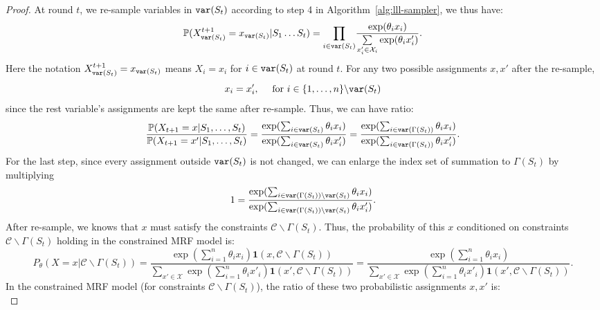 \begin{lemma}
\begin{proof}
At round $t$,  we re-sample variables in $\mathtt{var}(S_t)$ according to step 4 in Algorithm~\ref{alg:lll-sampler}, we thus have:
\begin{equation*}
\mathbb{P}(X^{t+1}_{\mathtt{var}(S_t)}=x_{\mathtt{var}(S_t)}|S_1 \ldots S_t)=\underset{{i\in\mathtt{var}(S_t)}}{\prod}\frac{\exp(\theta_i x_i)}{\underset{x'_i\in \mathcal{X}_i}{\sum}\exp(\theta_ix'_i)}.
\end{equation*}
Here the notation $X^{t+1}_{\mathtt{var}(S_t)}=x_{\mathtt{var}(S_t)}$ means $X_i=x_i$ for $i\in\mathtt{var}(S_t)$ at round $t$. For any two possible assignments $x,x'$ after the re-sample,
\begin{equation*}
x_i=x'_i,\quad \text{ for }i\in \{1,\ldots,n\}\backslash \mathtt{var}(S_t)
\end{equation*}
since the rest variable's assignments are kept the same after re-sample. Thus, we can have ratio:
\begin{equation}\label{eq:ratio-nelson}
\frac{\mathbb{P}(X_{t+1}=x|S_1,\ldots,S_t)}{\mathbb{P}(X_{t+1}=x'|S_1,\ldots, S_t)}=\frac{\exp(\sum_{i\in\mathtt{var}(S_t)}\theta_ix_i)}{\exp(\sum_{i\in\mathtt{var}(S_t)}\theta_ix'_i)} =\frac{\exp(\sum_{i\in\mathtt{var}(\Gamma(S_t))}\theta_ix_i)}{\exp(\sum_{i\in\mathtt{var}(\Gamma(S_t))}\theta_ix'_i)}.
\end{equation}
For the last step, since every assignment outside $\mathtt{var}(S_t)$ is not changed, we can enlarge the index set of summation to $\Gamma(S_t)$ by multiplying
\begin{align*}
1 = \frac{\exp(\sum_{i\in\mathtt{var}(\Gamma(S_t)) \backslash \mathtt{var}(S_t)}\theta_ix_i)}{\exp(\sum_{i\in\mathtt{var}(\Gamma(S_t))\backslash \mathtt{var}(S_t)}\theta_ix'_i)}.
\end{align*}
After re-sample, we knows that $x$ must satisfy the constraints $\mathcal{C}\backslash\Gamma(S_t)$. Thus, the probability of this $x$ conditioned on constraints $\mathcal{C}\backslash\Gamma(S_t)$ holding in the constrained MRF model is:
\begin{equation*}
P_{\theta}(X=x|\mathcal{C} \backslash \Gamma(S_t))
=\frac{\exp(\sum_{i=1}^n\theta_i x_i)\mathbf{1}(x,\mathcal{C}\backslash \Gamma(S_t))}{\sum_{x'\in\mathcal{X}} \exp(\sum_{i=1}^n\theta_i x'_i)\mathbf{1}\left(x',\mathcal{C}\backslash \Gamma(S_t)\right)}=\frac{\exp(\sum_{i=1}^n\theta_i x_i)}{\sum_{x'\in\mathcal{X}} \exp(\sum_{i=1}^n\theta_i x'_i)\mathbf{1}\left(x',\mathcal{C}\backslash \Gamma(S_t)\right)}.
\end{equation*}
In the constrained MRF model (for constraints  $\mathcal{C}\backslash\Gamma(S_t)$), the ratio of these two probabilistic assignments $x,x'$ is:
\begin{equation}\label{eq:ratio-cmrf}

\end{equation}
\end{proof}
\end{lemma}
